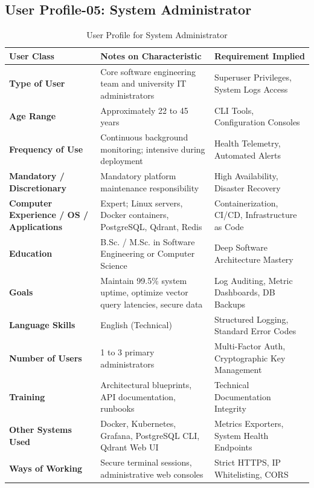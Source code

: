 \subsection{User Profile-05: System Administrator}
\label{subsec:profile_admin}

\begin{table}[H]
\centering
\small
\begin{tabularx}{\textwidth}{|l|X|p{4.2cm}|}
\hline
\rowcolor{lightgray!40} \textbf{User Class} & \textbf{Notes on Characteristic} & \textbf{Requirement Implied} \\ \hline
\textbf{Type of User} & Core software engineering team and university IT administrators & Superuser Privileges, System Logs Access \\ \hline
\textbf{Age Range} & Approximately 22 to 45 years & CLI Tools, Configuration Consoles \\ \hline
\textbf{Frequency of Use} & Continuous background monitoring; intensive during deployment & Health Telemetry, Automated Alerts \\ \hline
\textbf{Mandatory / Discretionary} & Mandatory platform maintenance responsibility & High Availability, Disaster Recovery \\ \hline
\textbf{Computer Experience / OS / Applications} & Expert; Linux servers, Docker containers, PostgreSQL, Qdrant, Redis & Containerization, CI/CD, Infrastructure as Code \\ \hline
\textbf{Education} & B.Sc. / M.Sc. in Software Engineering or Computer Science & Deep Software Architecture Mastery \\ \hline
\textbf{Goals} & Maintain 99.5\% system uptime, optimize vector query latencies, secure data & Log Auditing, Metric Dashboards, DB Backups \\ \hline
\textbf{Language Skills} & English (Technical) & Structured Logging, Standard Error Codes \\ \hline
\textbf{Number of Users} & 1 to 3 primary administrators & Multi-Factor Auth, Cryptographic Key Management \\ \hline
\textbf{Training} & Architectural blueprints, API documentation, runbooks & Technical Documentation Integrity \\ \hline
\textbf{Other Systems Used} & Docker, Kubernetes, Grafana, PostgreSQL CLI, Qdrant Web UI & Metrics Exporters, System Health Endpoints \\ \hline
\textbf{Ways of Working} & Secure terminal sessions, administrative web consoles & Strict HTTPS, IP Whitelisting, CORS \\ \hline
\end{tabularx}
\caption{User Profile for System Administrator}
\label{tab:user_profile_admin}
\end{table}

